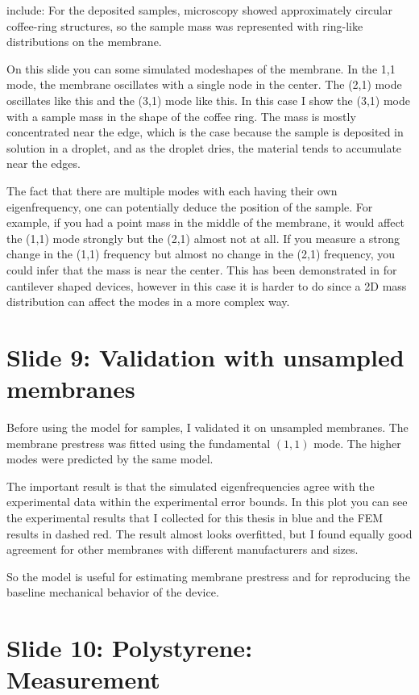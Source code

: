 \documentclass[11pt,a4paper]{article}
\begin{document}
include: 
For the deposited samples, microscopy showed approximately circular coffee-ring structures, so the sample mass was represented with ring-like distributions on the membrane.

On this slide you can some simulated modeshapes of the membrane. In the 1,1 mode, the membrane oscillates with a single node in the center. The (2,1) mode oscillates like this and the (3,1) mode like this.
In this case I show the (3,1) mode with a sample mass in the shape of the coffee ring. The mass is mostly concentrated near the edge, which is the case because the sample is deposited in solution in a droplet, and as the droplet dries, the material tends to accumulate near the edges.

The fact that there are multiple modes with each having their own eigenfrequency, one can potentially deduce the position of the sample. For example, if you had a point mass in the middle of the membrane, it would affect the (1,1) mode strongly but the (2,1) almost not at all. If you measure a strong change in the (1,1) frequency but almost no change in the (2,1) frequency, you could infer that the mass is near the center. This has been demonstrated in for cantilever shaped devices, however in this case it is harder to do since a 2D mass distribution can affect the modes in a more complex way.

\section*{Slide 9: Validation with unsampled membranes}

Before using the model for samples, I validated it on unsampled membranes. The membrane prestress was fitted using the fundamental $(1,1)$ mode. The higher modes were predicted by the same model.

The important result is that the simulated eigenfrequencies agree with the experimental data within the experimental error bounds. In this plot you can see the experimental results that I collected for this thesis in blue and the FEM results in dashed red.
The result almost looks overfitted, but I found equally good agreement for other membranes with different manufacturers and sizes.

So the model is useful for estimating membrane prestress and for reproducing the baseline mechanical behavior of the device.



\section*{Slide 10: Polystyrene: Measurement}
\end{document}
